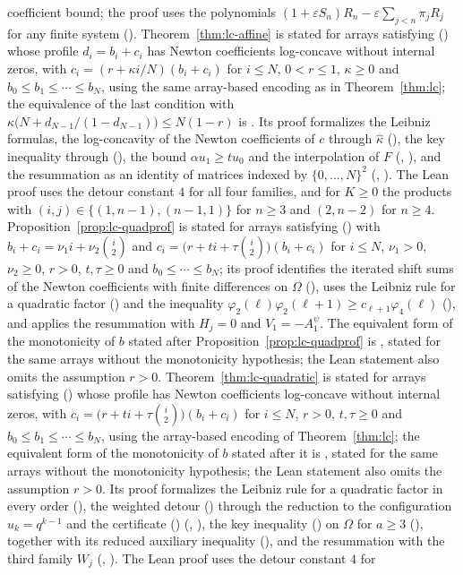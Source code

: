 \documentclass[twoside,10pt]{article}
\numberwithin{equation}{section}
\theoremstyle{slbody}
\theoremstyle{definition}
\theoremstyle{remark}
\renewcommand{\eqref}[1]{\textup{{\normalfont(\oldstylenums{\ref{#1}}}\normalfont)}}
\begin{document}
coefficient bound; the proof uses the polynomials $(1+\varepsilon S_n)R_n-\varepsilon\sum_{j<n}\pi_jR_j$ for any finite system (). Theorem~\ref{thm:lc-affine} is stated for arrays satisfying \eqref{eq:basic} whose profile $d_i=b_i+c_i$ has Newton coefficients log-concave without internal zeros, with $c_i=(r+\kappa i/N)(b_i+c_i)$ for $i\leq N$, $0<r\leq1$, $\kappa\geq0$ and $b_0\leq b_1\leq\cdots\leq b_N$, using the same array-based encoding as in Theorem~\ref{thm:lc}; the equivalence of the last condition with $\kappa\bigl(N+d_{N-1}/(1-d_{N-1})\bigr)\leq N(1-r)$ is . Its proof formalizes the Leibniz formulas, the log-concavity of the Newton coefficients of $c$ through $\widehat\kappa$ (), the key inequality through \eqref{eq:affine-red}, the bound $\alpha u_1\geq tu_0$ and the interpolation of $F$ (, ), and the resummation as an identity of matrices indexed by $\{0,\ldots,N\}^2$ (, ). The Lean proof uses the detour constant $4$ for all four families, and for $K\geq0$ the products with $(i,j)\in\{(1,n-1),(n-1,1)\}$ for $n\geq3$ and $(2,n-2)$ for $n\geq4$. Proposition~\ref{prop:lc-quadprof} is stated for arrays satisfying \eqref{eq:basic} with $b_i+c_i=\nu_1i+\nu_2\binom i2$ and $c_i=\bigl(r+ti+\tau\binom i2\bigr)(b_i+c_i)$ for $i\leq N$, $\nu_1>0$, $\nu_2\geq0$, $r>0$, $t,\tau\geq0$ and $b_0\leq\cdots\leq b_N$; its proof identifies the iterated shift sums of the Newton coefficients with finite differences on $\Omega$ (), uses the Leibniz rule for a quadratic factor () and the inequality $\varphi_2(\ell)\varphi_2(\ell+1)\geq c_{\ell+1}\varphi_4(\ell)$ (), and applies the resummation with $H_j=0$ and $V_1=-A^\psi_1$. The equivalent form of the monotonicity of $b$ stated after Proposition~\ref{prop:lc-quadprof} is , stated for the same arrays without the monotonicity hypothesis; the Lean statement also omits the assumption $r>0$. Theorem~\ref{thm:lc-quadratic} is stated for arrays satisfying \eqref{eq:basic} whose profile has Newton coefficients log-concave without internal zeros, with $c_i=\bigl(r+ti+\tau\binom i2\bigr)(b_i+c_i)$ for $i\leq N$, $r>0$, $t,\tau\geq0$ and $b_0\leq b_1\leq\cdots\leq b_N$, using the array-based encoding of Theorem~\ref{thm:lc}; the equivalent form of the monotonicity of $b$ stated after it is , stated for the same arrays without the monotonicity hypothesis; the Lean statement also omits the assumption $r>0$. Its proof formalizes the Leibniz rule for a quadratic factor in every order (), the weighted detour \eqref{eq:quad-B} through the reduction to the configuration $u_k=q^{k-1}$ and the certificate \eqref{eq:quad-cert} (, ), the key inequality \eqref{eq:quad-key} on $\Omega$ for $a\geq3$ (), together with its reduced auxiliary inequality (), and the resummation with the third family $W_j$ (, ). The Lean proof uses the detour constant $4$ for 
\end{document}

